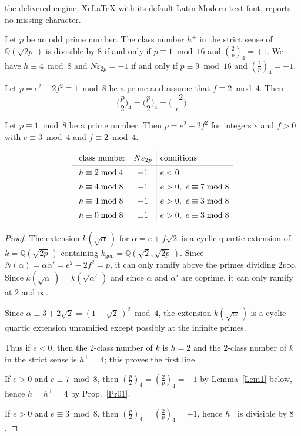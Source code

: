 \documentclass[10pt,a4paper]{amsart}
\newcommand{\Q}{{\mathbb Q}}
\newcommand{\eps}{\varepsilon}
\newcommand{\gen}{{\operatorname{gen}}}
\newcommand{\rsp}{\raisebox{0em}[2.7ex][1.3ex]{\rule{0em}{2ex} }}
\begin{document}
the delivered engine, XeLaTeX with its default Latin Modern text font, reports no missing character.
\begin{prop}\label{Pr01}
  Let $p$ be an odd prime number. The class number $h^+$ in the strict
  sense of $\Q(\sqrt{2p}\,)$ is divisible by $8$ if and only if
  $p \equiv 1 \bmod 16$ and $(\frac 2p)_4 = +1$.
  We have $h \equiv 4 \bmod 8$ and $N\eps_{2p} = -1$  if and only if
  $p \equiv 9 \bmod 16$ and $(\frac 2p)_4 = -1$.
\end{prop}

\begin{lem}\label{Lem1}
  Let $p = e^2 - 2f^2 \equiv 1 \bmod 8$ be a prime and assume that
  $f \equiv 2 \bmod 4$.  Then
  $$ \Big(\frac p2 \Big)_4 = \Big(\frac p2 \Big)_4 = \Big(\frac{-2}e \Big). $$
\end{lem}

\begin{prop}
  Let $p \equiv 1 \bmod 8$ be a prime number. Then $p = e^2 - 2f^2$
  for integers $e$ and $f > 0$ with $e \equiv 3 \bmod 4$ and
  $f \equiv 2 \bmod 4$.

  $$ \begin{array}{lc|l}
    \rsp \text{class number} &  N\eps_{2p} & \text{conditions} \\ \hline
    \rsp  h \equiv 2 \bmod 4 & +1    & e < 0 \\
    \rsp  h \equiv 4 \bmod 8 & -1    & e > 0, \ e \equiv 7 \bmod 8 \\
    \rsp  h \equiv 4 \bmod 8 & +1    & e > 0, \ e \equiv 3 \bmod 8 \\
    \rsp  h \equiv 0 \bmod 8 & \pm 1 & e > 0, \ e \equiv 3 \bmod 8
  \end{array} $$
\end{prop}

\begin{proof}
  The extension $k(\sqrt{\alpha}\,)$ for $\alpha = e + f\sqrt{2}$
  is a cyclic quartic extension of $k = \Q(\sqrt{2p}\,)$ containing
  $k_\gen = \Q(\sqrt{2},\sqrt{2p}\,)$. Since
  $N(\alpha) = \alpha\alpha' = e^2 - 2f^2 = p$, it can only ramify above
  the primes dividing $2 p \infty$. Since
  $k(\sqrt{\alpha}\,) = k(\sqrt{\alpha'}\,)$ and since $\alpha$ and $\alpha'$
  are coprime,  it can only ramify at $2$ and $\infty$.

  Since $\alpha \equiv 3+2\sqrt{2} = (1+\sqrt{2}\,)^2 \bmod 4$, the
  extension $k(\sqrt{\alpha}\,)$ is a cyclic quartic extension
  unramified except possibly at the infinite primes.

  Thus if $e < 0$, then the $2$-class number of $k$ is $h = 2$ and the
  $2$-class number of $k$ in the strict sense is $h^+ = 4$; this proves the
  first line.

  If $e > 0$ and $e \equiv 7 \bmod 8$, then $(\frac p2)_4 = (\frac2p)_4 = -1$
  by Lemma~\ref{Lem1} below, hence $h = h^+ = 4$ by Prop.~\ref{Pr01}.

  If $e > 0$ and $e \equiv 3 \bmod 8$, then $(\frac p2)_4 = (\frac2p)_4 = +1$,
  hence $h^+$ is divisible by $8$. 
\end{proof}
\end{document}
